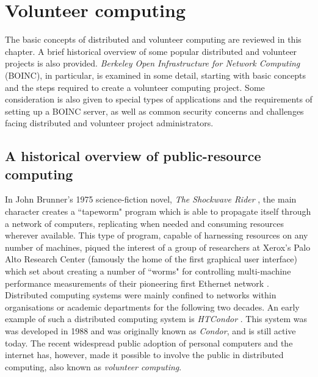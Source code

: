 \chapter{Volunteer computing}
\vspace{-2em}
\minitoc

The basic concepts of distributed and volunteer computing are reviewed in this chapter.  A brief historical overview   of some popular distributed and volunteer projects is also provided.  \emph{Berkeley Open Infrastructure for Network Computing} (BOINC), in particular,  is examined in some detail, starting with basic concepts and the steps required to create a volunteer computing project. Some consideration is also given to special types of applications and the requirements of setting up a BOINC server, as well as common security concerns and challenges facing distributed and volunteer project administrators.  
 
\section{A historical overview of public-resource computing} \label{VChist}
In John Brunner's 1975 science-fiction novel, \emph{The Shockwave Rider} \cite{brunner}, the main character creates a ``tapeworm" program which is able to propagate itself through a network of computers, replicating when needed and consuming resources wherever available. This type of program, capable of harnessing resources on any number of machines, piqued the interest of a group of researchers at Xerox's Palo Alto Research Center (famously the home of the first graphical user interface) which set about creating a number of ``worms"   for controlling multi-machine performance measurements of their pioneering first Ethernet network \cite{worms}. 
Distributed computing systems  were mainly confined to networks within organisations or academic departments for the following two decades.
An early example  of such a distributed computing system is \emph{HTCondor} \cite{condor, condor1}. This system was was developed in 1988 and was originally known as \emph{Condor}, and is still active today.
The recent widespread public adoption of personal computers and the internet has, however,  made it possible to involve the public in distributed computing, also known as \emph{volunteer computing}.

